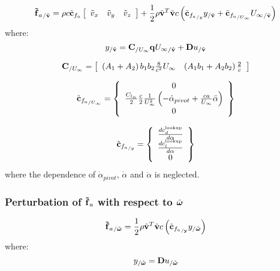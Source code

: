 \begin{equation}
{\bm{\mathbf{\tilde{f}}}_a}_{/\tilde{\bm{\mathbf{v}}}} = 
	\rho c \tilde{\bm{\mathbf{c}}}_{f_{a}} \left[
		\begin{array}{ccc}
			\tilde{v}_x & \tilde{v}_y & \tilde{v}_z
		\end{array} \right] +
	\frac{1}{2} \rho \tilde{\bm{\mathbf{v}}}^T \tilde{\bm{\mathbf{v}}} c
	\left(  \tilde{\bm{\mathbf{c}}}_{{f_{a}}_{/y}} y_{/\tilde{\bm{\mathbf{v}}}} + 
	\tilde{\bm{\mathbf{c}}}_{{f_{a}}_{/U_{\infty}}} {U_\infty}_{/\tilde{\bm{\mathbf{v}}}}  \right) 
\end{equation}
where:
\begin{equation}
y_{/\tilde{\bm{\mathbf{v}}}} = 
	\bm{\mathbf{C}}_{/U_{\infty}} \bm{\mathbf{q}}{U_\infty}_{/\tilde{\bm{\mathbf{v}}}}
	+ \bm{\mathbf{D}} u_{/\tilde{\bm{\mathbf{v}}}}
\end{equation}


\begin{equation}
\bm{\mathbf{C}}_{/U_\infty} = \left[
	\begin{array}{cccccc}
	\left(  A_1 + A_2 \right) b_1 b_2 \frac{8}{c^2} U_\infty & \left(  A_1 b_1 + A_2 b_2 \right) \frac{2}{c}\\
	\end{array}
	\right]
\end{equation}

\begin{equation}
\tilde{\bm{\mathbf{c}}}_{{f_{a}}_{/U_{\infty}}} = \left\{
	\begin{array}{c}
		0 \\
		\frac{C_{l_{\alpha}}}{2} \frac{c}{2} \frac{1}{U_\infty^2} 
		\left(  -\dot{\alpha}_{pivot} + \frac{c a}{U_\infty} \ddot{\alpha} \right) \\
		0
	\end{array} \right\}
\end{equation}

\begin{equation}
\tilde{\bm{\mathbf{c}}}_{{f_{a}}_{/y}} = \left\{
	\begin{array}{cccc}
		\frac{ d c_d^{\text{lookup}}}{d \alpha}\\
		\frac{ d c_l^{\text{lookup}}}{d \alpha}\\
		0
	\end{array} \right\}
\end{equation}
where the dependence of $\dot{\alpha}_{pivot}$, $\dot{\alpha}$ and $\ddot{\alpha}$ is 
neglected.

\subsubsection{Perturbation of $\bm{\mathbf{\tilde{f}}}_a$ with respect to $\tilde{\bm{\mathbf{\omega}}}$}
\begin{equation}
{\bm{\mathbf{\tilde{f}}}_a}_{/\tilde{\bm{\mathbf{\omega}}}} = 
	\frac{1}{2} \rho \tilde{\bm{\mathbf{v}}}^T \tilde{\bm{\mathbf{v}}} c
	\left(  \tilde{\bm{\mathbf{c}}}_{{f_{a}}_{/\bm{\mathbf{y}}}} y_{/\tilde{\bm{\mathbf{\omega}}}}  \right) 
\end{equation}
where:
\begin{equation}
y_{/\tilde{\bm{\mathbf{\omega}}}} = 
	\bm{\mathbf{D}} u_{/\tilde{\bm{\mathbf{\omega}}}}
\end{equation}
